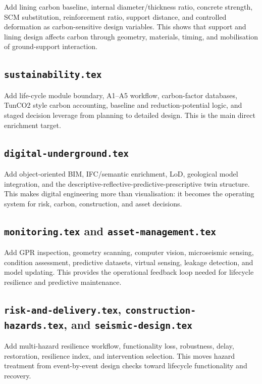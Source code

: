 \documentclass[11pt]{article}
\begin{document}
Add lining carbon baseline, internal diameter/thickness ratio, concrete
strength, SCM substitution, reinforcement ratio, support distance, and
controlled deformation as carbon-sensitive design variables. This shows that
support and lining design affects carbon through geometry, materials, timing,
and mobilisation of ground-support interaction.

\subsection*{\texttt{sustainability.tex}}

Add life-cycle module boundary, A1--A5 workflow, carbon-factor databases, TunCO2
style carbon accounting, baseline and reduction-potential logic, and staged
decision leverage from planning to detailed design. This is the main direct
enrichment target.

\subsection*{\texttt{digital-underground.tex}}

Add object-oriented BIM, IFC/semantic enrichment, LoD, geological model
integration, and the descriptive-reflective-predictive-prescriptive twin
structure. This makes digital engineering more than visualisation: it becomes
the operating system for risk, carbon, construction, and asset decisions.

\subsection*{\texttt{monitoring.tex} and \texttt{asset-management.tex}}

Add GPR inspection, geometry scanning, computer vision, microseismic sensing,
condition assessment, predictive datasets, virtual sensing, leakage detection,
and model updating. This provides the operational feedback loop needed for
lifecycle resilience and predictive maintenance.

\subsection*{\texttt{risk-and-delivery.tex}, \texttt{construction-hazards.tex}, and \texttt{seismic-design.tex}}

Add multi-hazard resilience workflow, functionality loss, robustness, delay,
restoration, resilience index, and intervention selection. This moves hazard
treatment from event-by-event design checks toward lifecycle functionality and
recovery.
\end{document}
